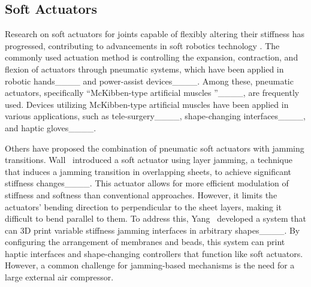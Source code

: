 \subsection{Soft Actuators }\label{2_3}

Research on soft actuators  for joints capable of flexibly altering their stiffness has progressed, contributing to advancements in soft robotics technology .
The commonly used actuation method is controlling the expansion, contraction, and flexion of actuators through pneumatic systems, which have been applied in robotic hands____ and power-assist devices____. 
Among these, pneumatic actuators, specifically ``McKibben-type artificial muscles ''____, are frequently used.
Devices utilizing McKibben-type artificial muscles have been applied in various applications, such as tele-surgery____, shape-changing interfaces____, and haptic gloves____.

Others have proposed the combination of pneumatic soft actuators with jamming transitions. 
Wall \etal\ introduced a soft actuator using layer jamming, a technique that induces a jamming transition in overlapping sheets, to achieve significant stiffness changes____. 
This actuator allows for more efficient modulation of stiffness and softness than conventional approaches. 
However, it limits the actuators' bending direction to perpendicular to the sheet layers, making it difficult to bend parallel to them.
To address this, Yang \etal\ developed a system that can 3D print variable stiffness jamming interfaces in arbitrary shapes____. 
By configuring the arrangement of membranes and beads, this system can print haptic interfaces and shape-changing controllers that function like soft actuators.
However, a common challenge for jamming-based mechanisms is the need for a large external air compressor.


